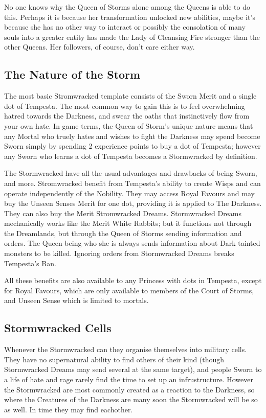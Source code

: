 No one knows why the Queen of Storms alone among the Queens is able to do this. Perhaps it is because her transformation unlocked new abilities, maybe it's because she has no other way to interact or possibly the consolation of many souls into a greater entity has made the Lady of Cleansing Fire stronger than the other Queens. Her followers, of course, don't care either way.

\subsection*{The Nature of the Storm}

The most basic Stromwracked template consists of the Sworn Merit and a single dot of Tempesta. The most common way to gain this is to feel overwhelming hatred towards the Darkness, and swear the oaths that instinctively flow from your own hate. In game terms, the Queen of Storm's unique nature means that any Mortal who truely hates and wishes to fight the Darkness may spend become Sworn simply by spending 2 experience points to buy a dot of Tempesta; however any Sworn who learns a dot of Tempesta becomes a Stormwracked by definition.

The Stormwracked have all the usual advantages and drawbacks of being Sworn, and more. Stromwracked benefit from Tempesta's ability to create Wisps and can operate independently of the Nobility. They may access Royal Favours and may buy the Unseen Senses Merit for one dot, providing it is applied to The Darkness. They can also buy the Merit Stromwracked Dreams. Stormwracked Dreams mechanically works like the Merit White Rabbits; but it functions not through the Dreamlands, but through the Queen of Storms sending information and orders. The Queen being who she is always sends information about Dark tainted monsters to be killed. Ignoring orders from Stormwracked Dreams breaks Tempesta's Ban. 

All these benefits are also available to any Princess with dots in Tempesta, except for Royal Favours, which are only available to members of the Court of Storms, and Unseen Sense which is limited to mortals.

\subsection*{Stormwracked Cells}

Whenever the Stormwracked can they organise themselves into military cells. They have no supernatural ability to find others of their kind (though Stormwracked Dreams may send several at the same target), and people Sworn to a life of hate and rage rarely find the time to set up an infrustructure. However the Stormwracked are most commonly created as a reaction to the Darkness, so where the Creatures of the Darkness are many soon the Stormwracked will be so as well. In time they may find eachother. 

